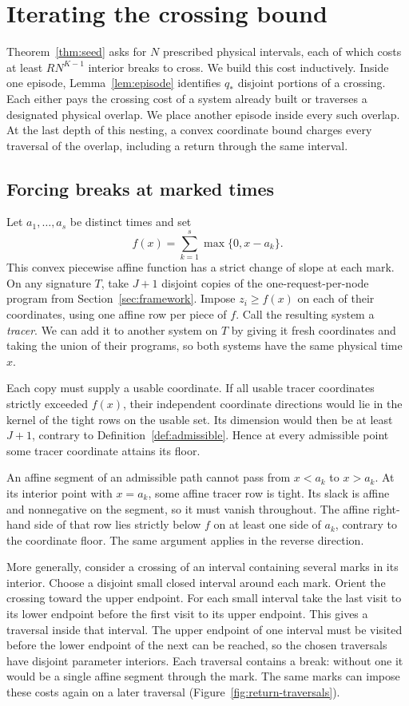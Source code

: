 \section{Iterating the crossing bound}\label{sec:recursion}

Theorem~\ref{thm:seed} asks for $N$ prescribed physical intervals, each of
which costs at least $RN^{K-1}$ interior breaks to cross. We build this
cost inductively. Inside one episode, Lemma~\ref{lem:episode} identifies
$q_*$ disjoint portions of a crossing. Each either pays the crossing cost
of a system already built or traverses a designated physical overlap.
We place another episode inside every such overlap. At the last depth
of this nesting, a convex coordinate bound charges every traversal of
the overlap, including a return through the same interval.

\subsection{Forcing breaks at marked times}
Let $a_1,\ldots,a_s$ be distinct times and set
\[
                         f(x)=\sum_{k=1}^s\max\{0,x-a_k\}.
\]
This convex piecewise affine function has a strict change of slope at
each mark. On any signature $T$, take $J+1$ disjoint copies of the
one-request-per-node program from Section~\ref{sec:framework}. Impose
$z_i\ge f(x)$ on each of their coordinates, using one affine row per
piece of $f$. Call the resulting system a \emph{tracer}. We can add it
to another system on $T$ by giving it fresh coordinates and taking the
union of their programs, so both systems have the same physical time $x$.

Each copy must supply a usable coordinate. If all usable tracer
coordinates strictly exceeded $f(x)$, their independent coordinate
directions would lie in the kernel of the tight rows on the usable set.
Its dimension would then be at least $J+1$, contrary to
Definition~\ref{def:admissible}. Hence at every admissible point some
tracer coordinate attains its floor.

An affine segment of an admissible path cannot pass from $x<a_k$ to
$x>a_k$. At its interior point with $x=a_k$, some affine tracer row
is tight. Its slack is affine and nonnegative on the segment, so it must
vanish throughout. The affine right-hand side of that row lies strictly
below $f$ on at least one side of $a_k$, contrary to the coordinate
floor. The same argument applies in the reverse direction.

More generally, consider a crossing of an interval containing several
marks in its interior. Choose a disjoint small closed interval around
each mark. Orient the crossing toward the upper endpoint. For each
small interval take the last visit to its lower endpoint before the
first visit to its upper endpoint. This gives a traversal inside that
interval. The upper endpoint of one interval must be visited before
the lower endpoint of the next can be reached, so the chosen traversals
have disjoint parameter interiors. Each traversal contains a break:
without one it would be a single affine segment through the mark.
The same marks can impose these costs again on a later traversal
(Figure~\ref{fig:return-traversals}).

